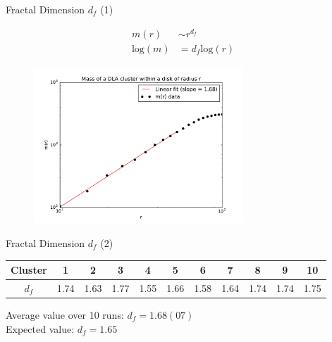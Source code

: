 \documentclass{beamer}
\begin{document}
\begin{frame}{Fractal Dimension $d_f$ (1)}
	
	\begin{align}
	m(r) &\sim r^{d_f} \nonumber \\
	\text{log}(m)  &= d_f \text{log}(r) \nonumber
	\end{align}
	
	\begin{figure}[H]
		\centering
		\includegraphics[width=0.7\textwidth]{mass_vs_R.pdf}
	\end{figure}
	
\end{frame}

\begin{frame}{Fractal Dimension $d_f$ (2)}
	
	
	\begin{center}
		\small
		\begin{tabular}{ |c|c|c|c|c|c|c|c|c|c|c| } 
			\hline
			Cluster & 1 & 2 & 3 & 4 & 5 & 6 & 7 & 8 & 9 & 10 \\ 
			\hline
			$d_f$& 1.74 & 1.63 & 1.77 & 1.55 & 1.66 & 1.58 & 1.64 & 1.74 & 1.74 & 1.75 \\ 
			\hline
		\end{tabular}
	\end{center}
	
	Average value over 10 runs: $d_f = 1.68(07)$\\
	Expected value: $d_f  = 1.65$
	
\end{frame}




\end{document}
